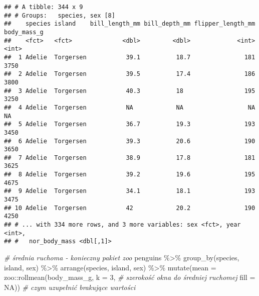 \documentclass[
]{book}
\newenvironment{Shaded}{\begin{snugshade}}{\end{snugshade}}
\newcommand{\AttributeTok}[1]{\textcolor[rgb]{0.77,0.63,0.00}{#1}}
\newcommand{\CommentTok}[1]{\textcolor[rgb]{0.56,0.35,0.01}{\textit{#1}}}
\newcommand{\ConstantTok}[1]{\textcolor[rgb]{0.00,0.00,0.00}{#1}}
\newcommand{\DecValTok}[1]{\textcolor[rgb]{0.00,0.00,0.81}{#1}}
\newcommand{\FunctionTok}[1]{\textcolor[rgb]{0.00,0.00,0.00}{#1}}
\newcommand{\NormalTok}[1]{#1}
\newcommand{\SpecialCharTok}[1]{\textcolor[rgb]{0.00,0.00,0.00}{#1}}
\begin{document}
\begin{verbatim}
## # A tibble: 344 x 9
## # Groups:   species, sex [8]
##    species island    bill_length_mm bill_depth_mm flipper_length_mm body_mass_g
##    <fct>   <fct>              <dbl>         <dbl>             <int>       <int>
##  1 Adelie  Torgersen           39.1          18.7               181        3750
##  2 Adelie  Torgersen           39.5          17.4               186        3800
##  3 Adelie  Torgersen           40.3          18                 195        3250
##  4 Adelie  Torgersen           NA            NA                  NA          NA
##  5 Adelie  Torgersen           36.7          19.3               193        3450
##  6 Adelie  Torgersen           39.3          20.6               190        3650
##  7 Adelie  Torgersen           38.9          17.8               181        3625
##  8 Adelie  Torgersen           39.2          19.6               195        4675
##  9 Adelie  Torgersen           34.1          18.1               193        3475
## 10 Adelie  Torgersen           42            20.2               190        4250
## # ... with 334 more rows, and 3 more variables: sex <fct>, year <int>,
## #   nor_body_mass <dbl[,1]>
\end{verbatim}

\begin{Shaded}
\begin{Highlighting}[]
\CommentTok{\# średnia ruchoma  {-} konieczny pakiet zoo}
\NormalTok{penguins }\SpecialCharTok{\%\textgreater{}\%} \FunctionTok{group\_by}\NormalTok{(species, island, sex) }\SpecialCharTok{\%\textgreater{}\%} \FunctionTok{arrange}\NormalTok{(species, island, sex) }\SpecialCharTok{\%\textgreater{}\%}
  \FunctionTok{mutate}\NormalTok{(}\AttributeTok{mean =}\NormalTok{ zoo}\SpecialCharTok{::}\FunctionTok{rollmean}\NormalTok{(body\_mass\_g,}
                              \AttributeTok{k =} \DecValTok{3}\NormalTok{, }\CommentTok{\# szerokość okna do średniej ruchomej}
                              \AttributeTok{fill =} \ConstantTok{NA}\NormalTok{)) }\CommentTok{\# czym uzupełnić brakujące wartości}
\end{Highlighting}
\end{Shaded}
\end{document}
